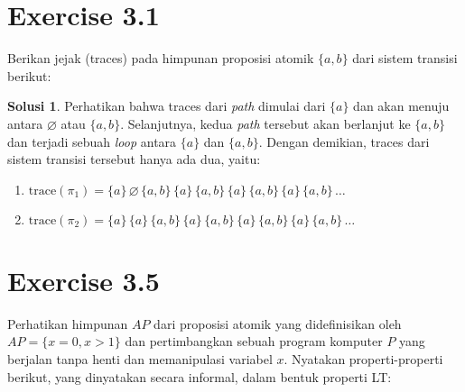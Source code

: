 \documentclass[a4paper]{article}
\theoremstyle{definition}
\newtheorem*{solusi}{Solusi}
\newcommand{\trace}{\text{trace}}
\begin{document}
\pagestyle{fancy}
\section*{Exercise 3.1}
\noindent Berikan jejak (traces) pada himpunan proposisi atomik \( \{a, b\} \) dari sistem transisi berikut:
\begin{center}
\end{center}

\begin{solusi}
  Perhatikan bahwa traces dari \textit{path} dimulai dari \(\{a\}\) dan akan menuju antara \(\varnothing\) atau \(\{a, b\}\). Selanjutnya, kedua \textit{path} tersebut akan berlanjut ke \(\{a, b\}\) dan terjadi sebuah \textit{loop} antara \(\{a\}\) dan \(\{a, b\}\). Dengan demikian, traces dari sistem transisi tersebut hanya ada dua, yaitu:
  \begin{enumerate}
    \item \(\trace(\pi_1)=\{a\}\, \varnothing\, \{a, b\}\, \{a\}\, \{a, b\}\, \{a\}\, \{a, b\}\, \{a\}\, \{a, b\}\, \ldots\)
    \item \(\trace(\pi_2)=\{a\}\, \{a\}\, \{a, b\}\, \{a\}\, \{a, b\}\, \{a\}\, \{a, b\}\, \{a\}\, \{a, b\}\, \ldots\)
  \end{enumerate}
\end{solusi}

\section*{Exercise 3.5}
\noindent Perhatikan himpunan \( AP \) dari proposisi atomik yang didefinisikan oleh 
\( AP = \{ x = 0, x > 1 \} \) dan pertimbangkan sebuah program komputer \( P \) yang berjalan tanpa henti 
dan memanipulasi variabel \( x \). Nyatakan properti-properti berikut, yang dinyatakan secara informal, dalam bentuk properti LT:
\end{document}
